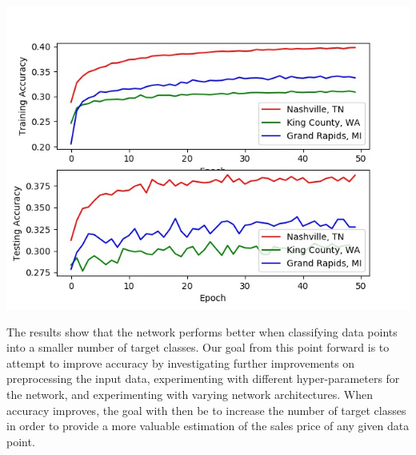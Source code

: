 \documentclass[10pt]{article}
\begin{document}
\begin{multicols}{2}
\begin{center}
			\label{fig:fig_nn_results_5}
		\end{center}
		\begin{center}
            \captionsetup{type=figure}
			\includegraphics[scale=0.38]{NeuralNet/nn_10_class_results} \\
			\label{fig:fig_nn_results_10}
		\end{center}
		The results show that the network performs better when classifying data points into a smaller number of target classes. Our goal from this point forward is to attempt to improve accuracy by investigating further improvements on preprocessing the input data, experimenting with different hyper-parameters for the network, and experimenting with varying network architectures. When accuracy improves, the goal with then be to increase the number of target classes in order to provide a more valuable estimation of the sales price of any given data point.

\end{multicols}
\end{document}
